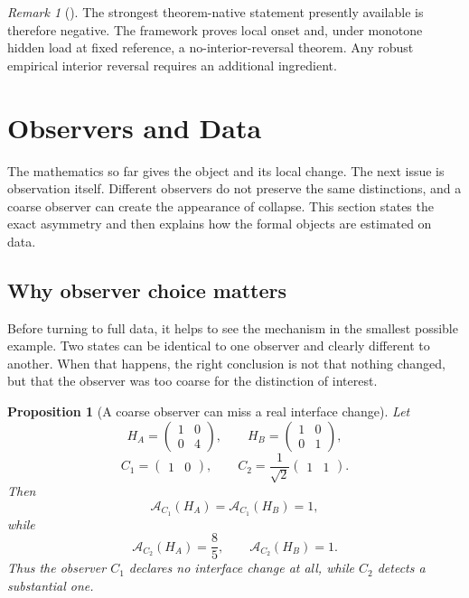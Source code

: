 \documentclass[11pt,a4paper]{article}
\numberwithin{equation}{section}
\newcommand{\Aobs}{\mathcal A}
\theoremstyle{thmcompact}
\newtheorem{proposition}[theorem]{Proposition}
\theoremstyle{remark}
\newtheorem*{remarkplain}{Remark}
\newenvironment{remark}[1][]%
{\begin{remarkbox}\begin{remarkplain}[#1]\normalfont}
{\end{remarkplain}\end{remarkbox}}
\begin{document}
\begin{remark}
The strongest theorem-native statement presently available is therefore negative. The framework proves local onset and, under monotone hidden load at fixed reference, a no-interior-reversal theorem. Any robust empirical interior reversal requires an additional ingredient.
\end{remark}

\section{Observers and Data}
\label{sec:observer-asymmetry-operationalisation}

The mathematics so far gives the object and its local change. The next issue is observation itself. Different observers do not preserve the same distinctions, and a coarse observer can create the appearance of collapse. This section states the exact asymmetry and then explains how the formal objects are estimated on data.

\subsection{Why observer choice matters}

Before turning to full data, it helps to see the mechanism in the smallest possible example. Two states can be identical to one observer and clearly different to another. When that happens, the right conclusion is not that nothing changed, but that the observer was too coarse for the distinction of interest.

\begin{proposition}[A coarse observer can miss a real interface change]
\label{prop:toy-example}
Let
\[
H_A=
\begin{pmatrix}
1&0\\
0&4
\end{pmatrix},
\qquad
H_B=
\begin{pmatrix}
1&0\\
0&1
\end{pmatrix},
\]
\[
C_1=\begin{pmatrix}1&0\end{pmatrix},
\qquad
C_2=\frac{1}{\sqrt2}\begin{pmatrix}1&1\end{pmatrix}.
\]
Then
\[
\Aobs_{C_1}(H_A)=\Aobs_{C_1}(H_B)=1,
\]
while
\[
\Aobs_{C_2}(H_A)=\frac85,
\qquad
\Aobs_{C_2}(H_B)=1.
\]
Thus the observer \(C_1\) declares no interface change at all, while \(C_2\) detects a substantial one.
\end{proposition}
\end{document}
